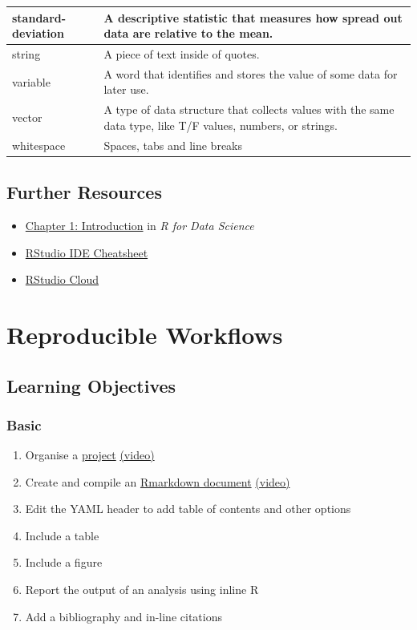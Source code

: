 \documentclass[
  oneside]{book}
\providecommand{\tightlist}{%
  \setlength{\itemsep}{0pt}\setlength{\parskip}{0pt}}
\begin{document}
\begin{tabular}{l|l}
\hline
standard-deviation & A descriptive statistic that measures how spread out data are relative to the mean.\\
\hline
string & A piece of text inside of quotes.\\
\hline
variable & A word that identifies and stores the value of some data for later use.\\
\hline
vector & A type of data structure that collects values with the same data type, like T/F values, numbers, or strings.\\
\hline
whitespace & Spaces, tabs and line breaks\\
\hline
\end{tabular}

\hypertarget{resources-intro}{%
\section{Further Resources}\label{resources-intro}}

\begin{itemize}
\tightlist
\item
  \href{http://r4ds.had.co.nz/introduction.html}{Chapter 1: Introduction} in \emph{R for Data Science}
\item
  \href{https://github.com/rstudio/cheatsheets/raw/master/rstudio-ide.pdf}{RStudio IDE Cheatsheet}
\item
  \href{https://rstudio.cloud/}{RStudio Cloud}
\end{itemize}

\hypertarget{repro}{%
\chapter{Reproducible Workflows}\label{repro}}

\hypertarget{ilo-repro}{%
\section{Learning Objectives}\label{ilo-repro}}

\hypertarget{basic}{%
\subsection*{Basic}\label{basic}}

\begin{enumerate}
\def\labelenumi{\arabic{enumi}.}
\tightlist
\item
  Organise a \protect\hyperlink{projects}{project} \href{https://youtu.be/y-KiPueC9xw}{(video)}
\item
  Create and compile an \protect\hyperlink{rmarkdown}{Rmarkdown document} \href{https://youtu.be/EqJiAlJAl8Y}{(video)}
\item
  Edit the YAML header to add table of contents and other options
\item
  Include a table
\item
  Include a figure
\item
  Report the output of an analysis using inline R
\item
  Add a bibliography and in-line citations
\end{enumerate}
\end{document}
